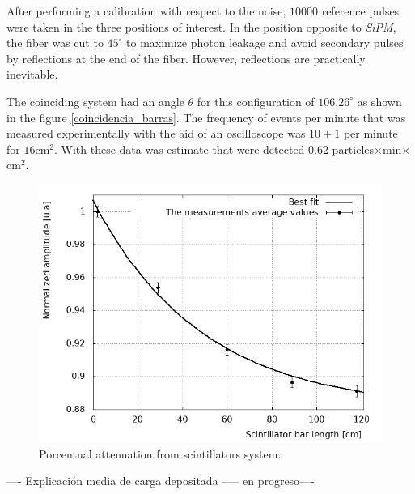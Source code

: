 \documentclass[submitting]{nst}
\begin{document}
After performing a calibration with respect to the noise, $10000$ reference pulses were taken in the three positions of interest. In the position opposite to \textsl{SiPM}, the fiber was cut to $45^{\circ}$ to maximize photon leakage and avoid secondary pulses by reflections at the end of the fiber. However, reflections are practically inevitable.

The coinciding system had an angle $\theta$ for this configuration of $106.26^{\circ}$ as shown in the figure \ref{coincidencia_barras}. The frequency of events per minute that was measured experimentally with the aid of an oscilloscope was $10\pm1$ per minute for $16$cm$^2$. With these data was estimate that were detected 0.62 particles$\times$min$\times$cm$^2$. \\



\begin{figure}[h!] %

    \centering
        \includegraphics[scale=0.49]{Figures/atenuacion_esperimental.png}
   \caption{Porcentual attenuation from scintillators system.} \label{experimental attenuation}
\end{figure}

---- Explicación media de carga depositada -----  en progreso----



\end{document}
